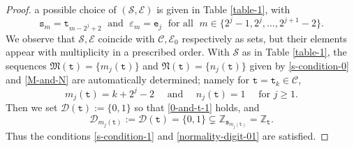 \documentclass[12pt, twoside]{article}
\theoremstyle{definition}
\numberwithin{equation}{section}
\begin{document}
\begin{proof}
a possible choice of $(\mathcal S, \mathcal E)$ is given in Table \ref{table-1}, with
\begin{equation} \mathtt s_m = \mathtt t_{m - 2^j + 2} \; \text{ and } \; \varepsilon_m = \mathtt e_j \; \text{ for all } \; m \in \bigl\{2^j-1, 2^j, \ldots, 2^{j+1}-2 \bigr\}. \label{sm-arrangement} \end{equation}  
We observe that $\mathcal S, \mathcal E$ coincide with $\mathscr{C}, \mathcal{E}_0$ respectively as sets, but their elements appear with multiplicity in a prescribed order. With $\mathcal{S}$ as in Table \ref{table-1}, the sequences $\mathfrak M(\mathtt t) = \{m_j(\mathtt t) \}$ and $\mathfrak N(\mathtt t) = \{n_j(\mathtt t) \}$ given by \eqref{s-condition-0} and \eqref{M-and-N} are automatically determined; namely
for $\mathtt t = \mathtt t_k \in \mathscr{C}$, 
\begin{equation} m_j(\mathtt t) = k + 2^j - 2 \quad \text{ and } \quad n_j(\mathtt t) = 1 \quad \text{ for } j \geq 1. \label{M-and-N-choice} \end{equation}  
Then we set $\mathscr{D}(\mathtt t) :=  \{0, 1\}$ so that \eqref{0-and-t-1} holds, and
\begin{equation}
	\mathscr{D}_{m_j(\mathtt t)} := \mathscr{D}(\mathtt t) = \{0, 1\} \subsetneq \mathbb Z_{\mathtt s_{m_j(\mathtt t)}} = \mathbb Z_{\mathtt t}.
	\label{not-Frostman-D} 
\end{equation} 
Thus the conditions \eqref{s-condition-1} and \eqref{normality-digit-01} are satisfied.


\end{proof}
\end{document}
